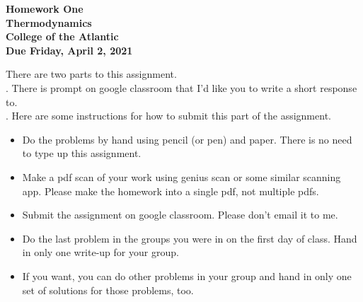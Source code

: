 \documentclass[12pt]{article}
\begin{document}
\pagestyle{empty}
 
\begin{center}
{\LARGE {\bf Homework One}}\\
\bigskip
{\Large {\bf Thermodynamics}}\\
\bigskip
{\Large {\bf College of the Atlantic}}\\
\bigskip
{ {\bf Due Friday, April 2, 2021}}\\ 
\end{center}
\medskip


\noindent There are two parts to this assignment.\\

.  There is prompt on google
classroom that I'd like you to write a short response to.\\

.  Here are some
instructions for how to submit this part of the assignment.
\begin{itemize}
  \setlength{\itemsep}{1mm}
\item Do the problems by hand using pencil (or pen) and paper.
  There is no need to type up this assignment.
\item Make a pdf scan of your work using genius scan or some
  similar scanning app.  Please make the homework into a single
  pdf, not multiple pdfs.
\item Submit the assignment on google classroom.  Please don't
  email it to me. 
\item Do the last problem in the groups you were in on the first day
  of class.  Hand in only one write-up for your group.
\item If you want, you can do other problems in your group and hand
  in only one set of solutions for those problems, too.
\end{itemize}
\end{document}
